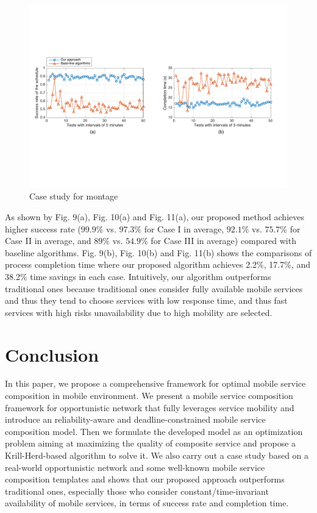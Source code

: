 \documentclass[journal]{IEEEtran}
\begin{document}
\begin{figure}[!t]
\centering
\includegraphics[width=6.6in]{./img/Task-24.pdf}
\caption{Case study for montage}
\label{Task-24}
\end{figure}

As shown by Fig. 9(a), Fig. 10(a) and Fig. 11(a), our proposed method achieves higher success rate ($99.9\%$ vs. $97.3\%$ for Case I in average, $92.1\%$ vs. $75.7\%$ for Case II in average, and $89\%$ vs. $54.9\%$ for Case III in average) compared with baseline algorithms.
Fig. 9(b), Fig. 10(b) and Fig. 11(b) shows the comparisons of process completion time where our proposed algorithm achieves 2.2\%, 17.7\%, and 38.2\% time savings in each case. 
Intuitively, our algorithm outperforms traditional ones because traditional ones consider fully available mobile services and thus they tend to choose services with low response time, and thus fast services with high risks unavailability due to high mobility are selected. 

\section{Conclusion}
In this paper, we propose a comprehensive framework for optimal mobile service composition in mobile environment. We present a mobile service composition framework for opportunistic network that fully leverages service mobility and introduce an reliability-aware and deadline-constrained mobile service composition model. Then we formulate the developed model as an optimization problem aiming at maximizing the quality of composite service and propose a Krill-Herd-based algorithm to solve it. We also carry out a case study based on a real-world opportunistic network and some well-known mobile service composition templates and shows that our proposed approach outperforms traditional ones, especially those who consider constant/time-invariant availability of mobile services, in terms of success rate and completion time.
\end{document}
